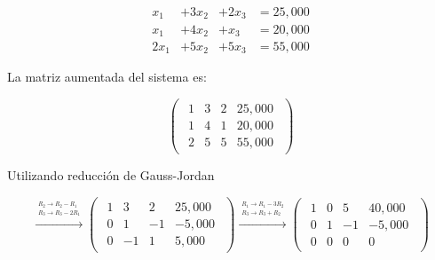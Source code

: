 \documentclass{article}
\begin{document}
\begin{equation*}
    \begin{aligned}
        x_1 &+ 3x_2 &+ 2x_3 &= 25,000\\
        x_1 &+ 4x_2 &+ x_3 &= 20,000\\
        2x_1 &+ 5x_2 &+ 5x_3 &= 55,000
    \end{aligned}
\end{equation*}

La matriz aumentada del sistema es:

\begin{equation*}
    \begin{pmatrix}
        \begin{array}{rrr|r}
            1 & 3 & 2 & 25,000\\
            1 & 4 & 1 & 20,000 \\
            2 & 5 & 5 & 55,000
        \end{array}
    \end{pmatrix}
\end{equation*}

\pagebreak

Utilizando reducción de Gauss-Jordan

\begin{equation*}
    \xrightarrow{\overset{\begin{aligned} R_2 \rightarrow R_2 - R_1 \\ R_3 \rightarrow R_3 - 2R_1\end{aligned}}{}} 
    \begin{pmatrix}
        \begin{array}{rrr|r}
            1& 3 & 2 & 25,000\\
            0 & 1 &-1 &-5,000 \\
            0 & -1 & 1 & 5,000
        \end{array}
    \end{pmatrix}
    \xrightarrow{\overset{\begin{aligned} R_1 \rightarrow R_1 - 3R_2 \\ R_3 \rightarrow R_3 + R_2\end{aligned}}{}} 
    \begin{pmatrix}
        \begin{array}{rrr|r}
            1 & 0 & 5 & 40,000\\
            0 & 1 & -1 & -5,000\\
            0 & 0 & 0 & 0
        \end{array}
    \end{pmatrix}
\end{equation*}
\end{document}

